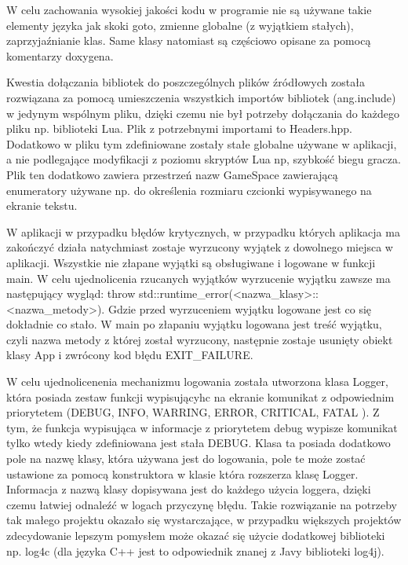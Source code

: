 W celu zachowania wysokiej jakości kodu w programie nie są używane takie elementy języka jak skoki goto, zmienne globalne (z wyjątkiem stałych), zaprzyjaźnianie klas. Same klasy natomiast są częściowo opisane za pomocą komentarzy doxygena.

Kwestia dołączania bibliotek do poszczególnych plików źródłowych została rozwiązana za pomocą umieszczenia wszystkich importów bibliotek (ang.include) w jedynym wspólnym pliku, dzięki czemu nie był potrzeby dołączania do każdego pliku np. biblioteki Lua. Plik z potrzebnymi importami to Headers.hpp. Dodatkowo w pliku tym zdefiniowane zostały stałe globalne używane w aplikacji, a nie podlegające modyfikacji z poziomu skryptów Lua np, szybkość biegu gracza. Plik ten dodatkowo zawiera przestrzeń nazw GameSpace zawierającą enumeratory używane np.  do określenia rozmiaru czcionki wypisywanego na ekranie tekstu.

W aplikacji w przypadku błędów krytycznych, w przypadku których aplikacja ma zakończyć działa natychmiast zostaje wyrzucony wyjątek z dowolnego miejsca w aplikacji. Wszystkie nie złapane wyjątki są obsługiwane i logowane w funkcji main. W celu ujednolicenia rzucanych wyjątków wyrzucenie wyjątku zawsze ma następujący wygląd: throw std::runtime\_error(<nazwa\_klasy>::<nazwa\_metody>). Gdzie przed wyrzuceniem wyjątku logowane jest co się dokładnie co stało. W main po złapaniu wyjątku logowana jest treść wyjątku, czyli nazwa metody z której został wyrzucony, następnie zostaje usunięty obiekt klasy App i zwrócony kod błędu EXIT\_FAILURE.
 
W celu ujednolicenenia mechanizmu logowania została utworzona klasa Logger, która posiada 
zestaw funkcji wypisującyhc na ekranie komunikat z odpowiednim priorytetem (DEBUG, INFO, WARRING, ERROR, CRITICAL, FATAL ). Z tym, że funkcja wypisująca w informacje z priorytetem debug wypisze komunikat tylko wtedy kiedy zdefiniowana jest stała DEBUG. Klasa ta posiada dodatkowo pole na nazwę klasy, która używana jest do logowania, pole te może zostać ustawione za pomocą konstruktora w klasie która rozszerza klasę Logger. Informacja z nazwą klasy dopisywana jest do każdego użycia loggera, dzięki czemu łatwiej odnaleźć w logach przyczynę błędu. Takie rozwiązanie na potrzeby tak małego projektu okazało się wystarczające, w przypadku większych projektów zdecydowanie lepszym pomysłem może okazać się użycie dodatkowej biblioteki np. log4c (dla języka C++ jest to odpowiednik znanej z Javy biblioteki log4j). 

